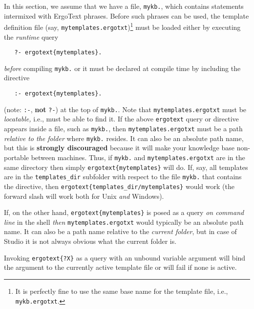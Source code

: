 In this section, we assume that we have a file, \texttt{mykb.\ergoext},
which contains \FLSYSTEM statements intermixed with ErgoText phrases.
Before such phrases can be used, the template definition file (say,
\texttt{mytemplates.ergotxt})\footnote{
  It is perfectly fine to use the same base name for the template file,
  i.e., \texttt{mykb.ergotxt}.
}
must be loaded either by executing the \emph{runtime}  query
\begin{verbatim}
   ?- ergotext{mytemplates}.
\end{verbatim}
\emph{before} compiling \texttt{mykb.\ergoext} or it must be declared
at compile time by including the directive
\begin{verbatim}
   :- ergotext{mytemplates}.
\end{verbatim}
(note: \texttt{:-}, \textbf{not} \texttt{?-}) at the top of
\texttt{mykb.\ergoext}.  Note that \texttt{mytemplates.ergotxt} must be
\emph{locatable,} i.e., \ERGO must be able to find it. If the above
\texttt{ergotext} query or directive appears inside a file, such as 
\texttt{mykb.\ergoext}, then
\texttt{mytemplates.ergotxt} must be a path \emph{relative to the folder}
where \texttt{mykb.\ergoext} resides. It can also be an absolute path name,
but this is \textbf{strongly discouraged} because it will make your knowledge
base non-portable between machines. 
Thus, if
\texttt{mykb.\ergoext} and \texttt{mytemplates.ergotxt} are in the same
directory then simply \texttt{ergotext\{mytemplates\}} will do. If, say, all
templates are in the \texttt{templates\_dir} subfolder with respect to
the file \texttt{mykb.\ergoext} that contains the directive,
then \texttt{ergotext\{templates\_dir/mytemplates\}}  would
work (the forward slash will work both for Unix \emph{and} Windows). 

If, on the other hand,
\texttt{ergotext\{mytemplates\}} is posed as a query \emph{on command line}
in the \ERGO shell \emph{then} \texttt{mytemplates.ergotxt} would typically
be an absolute path name. It can also be a path name relative to the
\emph{current folder}, but in case of \ERGOAI Studio it is not always obvious
what the current folder is.

Invoking \texttt{ergotext\{?X\}} as a query with an unbound variable
argument will bind the argument to the currently active template file or will
fail if none is active.

